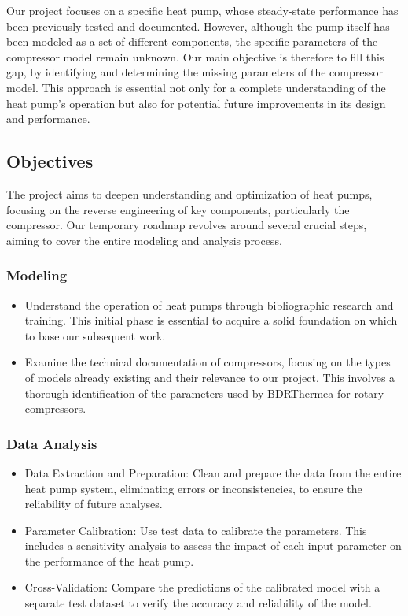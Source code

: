 \documentclass{report}
\begin{document}
Our project focuses on a specific heat pump, whose steady-state performance has been previously tested and documented. However, although the pump itself has been modeled as a set of different components, the specific parameters of the compressor model remain unknown. Our main objective is therefore to fill this gap, by identifying and determining the missing parameters of the compressor model. This approach is essential not only for a complete understanding of the heat pump's operation but also for potential future improvements in its design and performance.

\subsection{Objectives}

The project aims to deepen understanding and optimization of heat pumps, focusing on the reverse engineering of key components, particularly the compressor. Our temporary roadmap revolves around several crucial steps, aiming to cover the entire modeling and analysis process.

\subsubsection{Modeling}

\begin{itemize}
    \item Understand the operation of heat pumps through bibliographic research and training. This initial phase is essential to acquire a solid foundation on which to base our subsequent work.

    \item Examine the technical documentation of compressors, focusing on the types of models already existing and their relevance to our project. This involves a thorough identification of the parameters used by BDRThermea for rotary compressors.
\end{itemize}

\subsubsection{Data Analysis}
\begin{itemize}

\item Data Extraction and Preparation: Clean and prepare the data from the entire heat pump system, eliminating errors or inconsistencies, to ensure the reliability of future analyses.

\item Parameter Calibration: Use test data to calibrate the parameters. This includes a sensitivity analysis to assess the impact of each input parameter on the performance of the heat pump. 

\item Cross-Validation: Compare the predictions of the calibrated model with a separate test dataset to verify the accuracy and reliability of the model.
\end{itemize}
\end{document}
